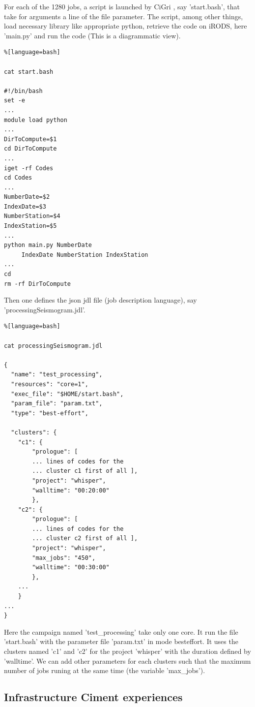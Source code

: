 \documentclass[a4paper, 10pt]{article}
\begin{document}
\begin{multicols}{2}
For each of the 1280 jobs, a script is launched by CiGri , say 'start.bash', that take for
arguments a line of the file parameter. The script, among other things, load necessary library like appropriate python, retrieve the code on iRODS,
here 'main.py' and run the code (This is a diagrammatic view).

\begin{lstlisting}%[language=bash]

cat start.bash

#!/bin/bash
set -e
...
module load python
...
DirToCompute=$1
cd DirToCompute
...
iget -rf Codes
cd Codes
...
NumberDate=$2
IndexDate=$3
NumberStation=$4
IndexStation=$5
...
python main.py NumberDate 
     IndexDate NumberStation IndexStation
...
cd
rm -rf DirToCompute
\end{lstlisting}

Then one defines the json jdl file (job description language), say 'processingSeismogram.jdl'.

\begin{lstlisting}%[language=bash]

cat processingSeismogram.jdl

{
  "name": "test_processing",
  "resources": "core=1",
  "exec_file": "$HOME/start.bash",
  "param_file": "param.txt",
  "type": "best-effort",
  
  "clusters": {
    "c1": {
       	"prologue": [
       	... lines of codes for the 
       	... cluster c1 first of all ],
       	"project": "whisper",
       	"walltime": "00:20:00"
       	},
    "c2": {
    	"prologue": [
        ... lines of codes for the 
        ... cluster c2 first of all ],
        "project": "whisper",
        "max_jobs": "450",
        "walltime": "00:30:00"
    	},
    ...
    }
...
}
\end{lstlisting}

Here the campaign named 'test\_processing' take only one core. It run the file 'start.bash' with the parameter
file 'param.txt' in mode besteffort. It uses the clusters named 'c1' and 'c2' for the project 'whisper' with the duration
defined by 'walltime'. We can add other parameters for each clusters such that the maximum number of
jobs runing at the same time (the variable 'max\_jobs').


\subsection{Infrastructure Ciment experiences}


\end{multicols}
\end{document}
